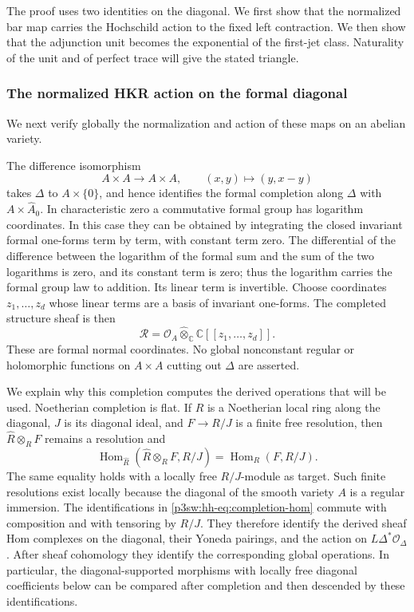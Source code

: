 \documentclass[11pt]{article}
\numberwithin{equation}{section}
\begin{document}
The proof uses two identities on the diagonal.  We first show that
the normalized bar map carries the Hochschild action to the fixed
left contraction.  We then show that the adjunction unit becomes
the exponential of the first-jet class.  Naturality of the unit and
of perfect trace will give the stated triangle.

\subsubsection{The normalized HKR action on the formal diagonal}
We next verify globally the normalization and action of these maps on
an abelian variety.

The difference isomorphism
\[
 A\times A\longrightarrow A\times A,\qquad
 (x,y)\longmapsto(y,x-y)
\]
takes \(\Delta\) to \(A\times\{0\}\), and hence identifies the formal
completion along \(\Delta\) with \(A\times\widehat A_0\).
In characteristic zero a commutative formal group has logarithm
coordinates.  In this case they can be obtained by integrating the
closed invariant formal one-forms term by term, with constant term
zero.  The differential of the difference between the logarithm of
the formal sum and the sum of the two logarithms is zero, and its
constant term is zero; thus the logarithm carries the formal group law
to addition.  Its linear term is invertible.  Choose coordinates
\(z_1,\ldots,z_d\) whose linear terms are a basis of invariant
one-forms.  The completed structure sheaf is then
\[
 \mathcal R=\mathcal O_A\widehat\otimes_{\mathbb C}
                         \mathbb C[[z_1,\ldots,z_d]].
\]
These are formal normal coordinates.  No global nonconstant regular
or holomorphic functions on \(A\times A\) cutting out \(\Delta\)
are asserted.

We explain why this completion computes the derived operations that
will be used.  Noetherian completion is flat.  If \(R\) is a
Noetherian local ring along the diagonal, \(J\) is its diagonal ideal,
and \(F\to R/J\) is a finite free resolution, then
\(\widehat R\otimes_R F\) remains a resolution and
\begin{equation}
 \operatorname{Hom}_{\widehat R}
       (\widehat R\otimes_R F,R/J)
       =\operatorname{Hom}_R(F,R/J).
\label{p3sw:hh-eq:completion-hom}
\end{equation}
The same equality holds with a locally free \(R/J\)-module as target.
Such finite resolutions exist locally because the diagonal of the
smooth variety \(A\) is a regular immersion.  The identifications in
\eqref{p3sw:hh-eq:completion-hom} commute with composition and with
tensoring by \(R/J\).  They therefore identify the derived sheaf Hom
complexes on the diagonal, their Yoneda pairings, and the action on
\(L\Delta^*\mathcal O_\Delta\).  After sheaf cohomology they identify
the corresponding global operations.  In particular, the
diagonal-supported morphisms with locally free diagonal coefficients
below can be compared after completion and then descended by these
identifications.
\end{document}
